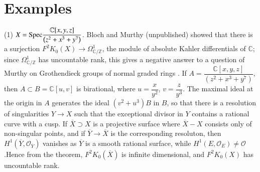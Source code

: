 \section{Examples}

(1) $X=\mathrm{Spec} \dfrac{\mathbb{C}[x,y,z]}{\left(z^{2}+x^{3}+y^{7}\right)}$. Bloch and Murthy (unpublished) showed that there is a surjection $F^{2}K_0(X)\to \Omega^{1}_{\mathbb{C}/\mathbb{Z}}$, the module of absolute Kahler differentials of $\mathbb{C}$; since $\Omega^{1}_{\mathbb{C}/\mathbb{Z}}$ has uncountable rank, this gives a negative answer to a question of Murthy on Grothendieck groups of normal graded rings \cite{Bass}. If $A=\dfrac{\mathbb{C}[x,y,z]}{\left(z^{2}+x^{3}+y^{7}\right)}$, then $A\subset B=\mathbb{C}[u, v]$ is birational, where $u=\dfrac{x}{y^{2}}$, $v=\dfrac{z}{y^{3}}$. The maximal ideal at the origin in $A$ generates the ideal $\left(v^{2}+u^{3}\right)B$ in $B$, so that there is a resolution of singularities $Y\to X$ such that the exceptional divisor in $Y$ contains a rational curve with a cusp. If $\overline{X}\supset X$ is a projective surface where $\overline{X}-X$ consists only of non-singular points, and if $\overline{Y}\to \overline{X}$ is the corresponding resoluton, then $H^{1}(\overline{Y}, \mathscr{O}_{\overline{Y}})$ vanishes as $\overline{Y}$ is a smooth rational surface, while $H^{1}(E,\mathscr{O}_E)\neq \mathscr{O}$.\pageoriginale Hence from the theorem, $F^{2}K_0(\overline{X})$ is infinite dimensional, and $F^{2}K_0(X)$ has uncountable rank. 

